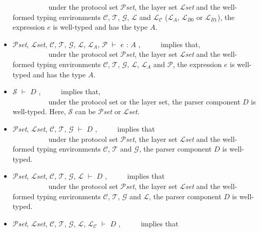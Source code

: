 \documentclass{article}
\begin{document}
\begin{itemize}
  ~~~~~~~~~~under the protocol set $\mathcal{P}$\textit{set}, the layer set $\mathcal{L}$\textit{set} and the well-formed typing environments $\mathcal{C}$, $\mathcal{T}$, $\mathcal{G}$, $\mathcal{L}$ and $\mathcal{L_{C}}$ ($\mathcal{L}_{A}$, $\mathcal{L}_{B0}$ or $\mathcal{L}_{B1}$), the expression $e$ is well-typed and has the type $A$.
  \item $\mathcal{P}$\textit{set}, $\mathcal{L}$\textit{set}, $\mathcal{C}$, $\mathcal{T}$, $\mathcal{G}$, $\mathcal{L}$, $\mathcal{L}_{A}$, $\mathcal{P}$ $\vdash$ $e$ : $A$ , ~~~~~implies that, \\
  ~~~~~~~~~~under the protocol set $\mathcal{P}$\textit{set}, the layer set $\mathcal{L}$\textit{set} and the well-formed typing environments $\mathcal{C}$, $\mathcal{T}$, $\mathcal{G}$, $\mathcal{L}$, $\mathcal{L}_{A}$ and $\mathcal{P}$, the expression $e$ is well-typed and has the type $A$.
  \item $\mathcal{S}$ $\vdash$ $D$ , ~~~~~implies that, \\
  ~~~~~~~~~~under the protocol set or the layer set, the parser component $D$ is well-typed. Here, $\mathcal{S}$ can be $\mathcal{P}$\textit{set} or $\mathcal{L}$\textit{set}.
\item $\mathcal{P}$\textit{set}, $\mathcal{L}$\textit{set}, $\mathcal{C}$, $\mathcal{T}$, $\mathcal{G}$ $\vdash$ $D$ , ~~~~~implies that \\
  ~~~~~~~~~~under the protocol set $\mathcal{P}$\textit{set}, the layer set $\mathcal{L}$\textit{set} and the well-formed typing environments $\mathcal{C}$, $\mathcal{T}$ and $\mathcal{G}$, the parser component $D$ is well-typed.
  \item $\mathcal{P}$\textit{set}, $\mathcal{L}$\textit{set}, $\mathcal{C}$, $\mathcal{T}$, $\mathcal{G}$, $\mathcal{L}$ $\vdash$ $D$ , ~~~~~implies that \\
  ~~~~~~~~~~under the protocol set $\mathcal{P}$\textit{set}, the layer set $\mathcal{L}$\textit{set} and the well-formed typing environments $\mathcal{C}$, $\mathcal{T}$, $\mathcal{G}$ and $\mathcal{L}$, the parser component $D$ is well-typed.
  \item $\mathcal{P}$\textit{set}, $\mathcal{L}$\textit{set}, $\mathcal{C}$, $\mathcal{T}$, $\mathcal{G}$, $\mathcal{L}$, $\mathcal{L_{C}}$ $\vdash$ $D$ , ~~~~~implies that \\

\end{itemize}
\end{document}
